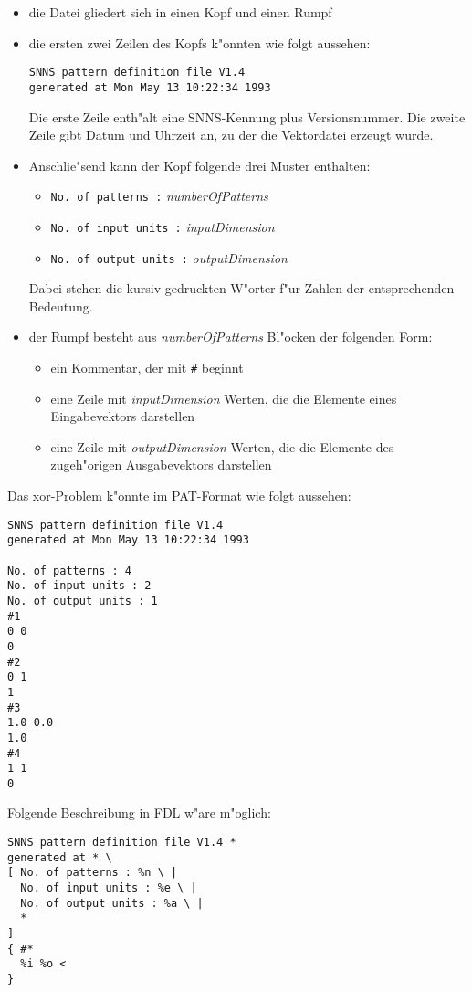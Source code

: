 \nopagebreak
\begin{itemize}
\item die Datei gliedert sich in einen Kopf und einen Rumpf
\item die ersten zwei Zeilen des Kopfs k"onnten wie folgt aussehen:
\begin{verbatim}
SNNS pattern definition file V1.4 
generated at Mon May 13 10:22:34 1993 
\end{verbatim}
Die erste Zeile enth"alt eine SNNS-Kennung plus Versionsnummer.
Die zweite Zeile gibt Datum und Uhrzeit an, zu der die Vektordatei
erzeugt wurde. 
\item Anschlie"send kann der Kopf folgende drei Muster enthalten:
\begin{itemize}
\item {\tt No. of patterns :} {\it numberOfPatterns}
\item {\tt No. of input units :} {\it inputDimension}
\item {\tt No. of output units :} {\it outputDimension}
\end{itemize} 
Dabei stehen die kursiv gedruckten W"orter f"ur Zahlen der 
entsprechenden Bedeutung.
\item der Rumpf besteht aus {\it numberOfPatterns} Bl"ocken der 
folgenden Form:
\begin{itemize}
\item ein Kommentar, der mit {\tt \#} beginnt
\item eine Zeile mit {\it inputDimension} Werten, die die Elemente
eines Eingabevektors darstellen 
\item eine Zeile mit {\it outputDimension} Werten, die die Elemente
des zugeh"origen Ausgabevektors darstellen 
\end{itemize}
\end{itemize}

Das xor-Problem k"onnte im PAT-Format wie folgt aussehen:

\nopagebreak
\begin{verbatim}
SNNS pattern definition file V1.4 
generated at Mon May 13 10:22:34 1993 

No. of patterns : 4
No. of input units : 2
No. of output units : 1
#1
0 0
0
#2
0 1
1
#3
1.0 0.0
1.0
#4
1 1
0
\end{verbatim}

Folgende Beschreibung in FDL w"are m"oglich:

\nopagebreak
\begin{verbatim}
SNNS pattern definition file V1.4 * 
generated at * \
[ No. of patterns : %n \ |
  No. of input units : %e \ |
  No. of output units : %a \ |
  *
]
{ #* 
  %i %o <
}
\end{verbatim}

